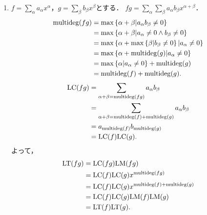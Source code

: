 \documentclass[9pt]{ltjsarticle}
\theoremstyle{break}
\theoremstyle{break}
\theoremstyle{break}
\theoremstyle{break}
\theoremstyle{break}
\theoremstyle{break}
\theoremstyle{break}
\theoremstyle{break}
\theoremstyle{break}
\theoremstyle{break}
\theoremstyle{break}
\theoremstyle{break}
\theoremstyle{break}
\theoremstyle{break}
\theoremstyle{break}
\theoremstyle{nonumberbreak}
\theoremstyle{nonumberbreak}
\begin{document}
\begin{enumerate}[label=(問題\arabic*)]
\begin{enumerate}[label=(\alph*)]
 \item
$f=\sum_\alpha a_\alpha x^\alpha$，$g=\sum_\beta b_\beta x^\beta$とする．
 $fg=\sum_\alpha \sum_\beta a_\alpha b_\beta x^{\alpha +\beta}$．
\begin{align}
 \mathrm{multideg}(fg)
&=
\max\left\{\alpha + \beta  | a_\alpha b_\beta \neq 0\right\}\\
 & =
\max\left\{\alpha + \beta  | a_\alpha \neq 0 \land b_\beta \neq 0\right\}\\
 & =
\max\left\{\alpha + \max\left\{\beta | b_\beta \neq 0\right\} | a_\alpha \neq 0\right\}\\
 & =
\max\left\{\alpha + \mathrm{multideg}(g) | a_\alpha \neq 0\right\}\\
 & =
\max\left\{\alpha | a_\alpha \neq 0\right\}+ \mathrm{multideg}(g) \\
 & =
\mathrm{multideg}(f) + \mathrm{multideg}(g).
\end{align}
\begin{align}
 {\rm LC}(fg)
&=
\sum_{\alpha + \beta = \mathrm{multideg}(fg)} a_{\alpha}b_\beta\\
 & =
\sum_{\alpha + \beta = \mathrm{multideg}(f)+\mathrm{multideg}(g)} a_{\alpha}b_\beta\\
 & =
a_{\mathrm{multideg}(f)} b_{\mathrm{multideg}(g)}\\
 & =
{\rm LC}(f) {\rm LC}(g).
\end{align}
よって，
\begin{align}
 {\rm LT}(fg)
&=
{\rm LC}(fg){\rm LM}(fg)\\
 & =
{\rm LC}(f){\rm LC}(g) x^{\mathrm{multideg}(fg)}\\
 & =
{\rm LC}(f){\rm LC}(g) x^{\mathrm{multideg}(f)+\mathrm{multideg}(g)}\\
 & =
{\rm LC}(f){\rm LC}(g){\rm LM}(f){\rm LM}(g)\\
 & =
{\rm LT}(f){\rm LT}(g).
\end{align}


\end{enumerate}
\end{enumerate}
\end{document}
